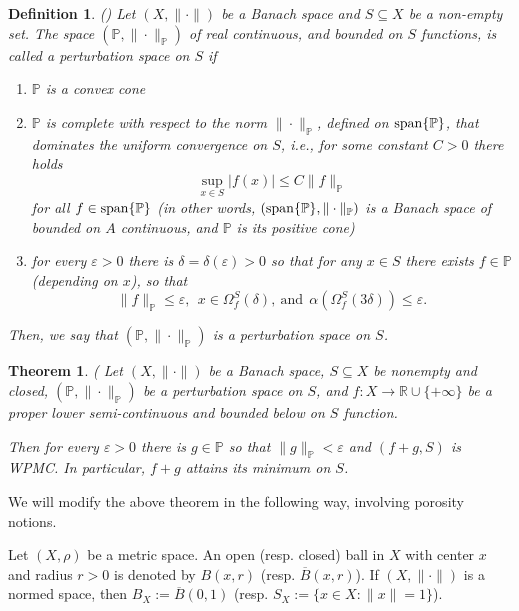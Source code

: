 \documentclass[12pt]{article}
\theoremstyle{thmstyleone}%
\newtheorem{theorem}{Theorem}
\theoremstyle{thmstyletwo}%
\theoremstyle{thmstylethree}%
\newtheorem{definition}{Definition}%
\begin{document}
\begin{definition}\label{definition:2}(\cite{Topalova-Zlateva})
	Let $(X,\|\cdot\|)$ be a Banach space and $S\subseteq X$ be a non-empty set. The space $(\mathbb{P},\|\cdot\|_{\mathbb{P}})$ of real continuous, and bounded on $S$ functions, is called a perturbation space on $S$ if
	\begin{enumerate}[label=(d\ref{definition:2}.\roman*)]
		\item\label{lab:d2-1} $\mathbb{P}$ is a convex cone
		\item\label{lab:d2-2} $\mathbb{P}$ is complete with respect to the norm $\|\cdot\|_{\mathbb{P}}$,
		defined on ${\rm span}\{\mathbb{P}\}$, that dominates the uniform convergence on $S$, i.e.,   for some constant $C>0$ there holds 
		$$%
		\sup_{x\in S}|f(x)|\leq C\|f\|_{\mathbb{P}}
		$$
		for all $f\in {\rm span}\{\mathbb{P}\}$
		(in other words, $({\rm span}\{\mathbb{P}\},\|\cdot\|_{\mathbb{P}})$ is a Banach space 
		of bounded on $A$ continuous, and $\mathbb{P}$ is its positive cone)
		\item\label{lab:d2-3} for every $\varepsilon>0$ there is $\delta=\delta(\varepsilon)>0$ so that for any $x\in S$ there exists $f\in \mathbb{P}$ (depending on $x$), so that 
		$$
		\|f\|_{\mathbb{P}}\leq \varepsilon,\ \ 
		x\in \Omega_{f}^S\left(\delta\right),\ \mbox{and}\ \ 
		\alpha(\Omega_{f}^S\left(3\delta\right))\leq \varepsilon.
		$$
	\end{enumerate}
	Then, we say that $(\mathbb{P},\|\cdot\|_{\mathbb{P}})$ is a perturbation space on $S$.
\end{definition}

\begin{theorem}\label{theorem:2}(\cite{Topalova-Zlateva}
	Let $(X,\|\cdot\|)$ be a Banach space, $S\subseteq X$ be nonempty and closed, $(\mathbb{P},\|\cdot\|_{\mathbb{P}})$ be a perturbation space on $S$, and $f:X\to \mathbb{R}\cup\{+\infty\}$ be a proper lower semi-continuous and bounded below on $S$ function.
	
	Then for every $\varepsilon>0$ there is $g\in \mathbb{P}$ so that $\|g\|_{\mathbb{P}}< \varepsilon$
	and $(f+g,S)$ is WPMC. In particular, $f+g$ attains its minimum on $S$.
\end{theorem}

We will modify the above theorem in the following way, involving porosity notions.

Let $(X,\rho)$ be a metric space. An open  (resp. closed) ball in $X$ with
center  $x$ and radius  $r>0$  is denoted by  $B(x,r)$  (resp. $\overline
B(x,r)$). If $(X,\|\cdot\|)$ is a normed space, then $B_X:=\overline{B}(0,1)$ (resp. $S_X:=\{x\in X: \|x\|=1\}$).   
\end{document}
